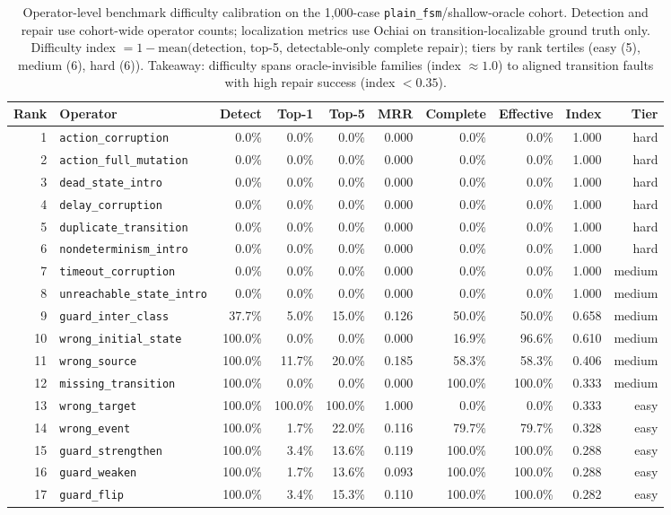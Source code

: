 \begin{table}[t]
\caption{Operator-level benchmark difficulty calibration on the 1{,}000-case \texttt{plain\_fsm}/shallow-oracle cohort. Detection and repair use cohort-wide operator counts; localization metrics use Ochiai on transition-localizable ground truth only. Difficulty index $=1-\mathrm{mean}($detection, top-5, detectable-only complete repair$)$; tiers by rank tertiles (easy (5), medium (6), hard (6)). Takeaway: difficulty spans oracle-invisible families (index $\approx 1.0$) to aligned transition faults with high repair success (index $<0.35$).}
\label{tab:operator-difficulty-ranking}
\small
\begin{tabular}{@{}rlrrrrrrrr@{}}
\toprule
Rank & Operator & Detect & Top-1 & Top-5 & MRR & Complete & Effective & Index & Tier \\
\midrule
1 & \texttt{action\_corruption} & 0.0\% & 0.0\% & 0.0\% & 0.000 & 0.0\% & 0.0\% & 1.000 & hard \\
2 & \texttt{action\_full\_mutation} & 0.0\% & 0.0\% & 0.0\% & 0.000 & 0.0\% & 0.0\% & 1.000 & hard \\
3 & \texttt{dead\_state\_intro} & 0.0\% & 0.0\% & 0.0\% & 0.000 & 0.0\% & 0.0\% & 1.000 & hard \\
4 & \texttt{delay\_corruption} & 0.0\% & 0.0\% & 0.0\% & 0.000 & 0.0\% & 0.0\% & 1.000 & hard \\
5 & \texttt{duplicate\_transition} & 0.0\% & 0.0\% & 0.0\% & 0.000 & 0.0\% & 0.0\% & 1.000 & hard \\
6 & \texttt{nondeterminism\_intro} & 0.0\% & 0.0\% & 0.0\% & 0.000 & 0.0\% & 0.0\% & 1.000 & hard \\
7 & \texttt{timeout\_corruption} & 0.0\% & 0.0\% & 0.0\% & 0.000 & 0.0\% & 0.0\% & 1.000 & medium \\
8 & \texttt{unreachable\_state\_intro} & 0.0\% & 0.0\% & 0.0\% & 0.000 & 0.0\% & 0.0\% & 1.000 & medium \\
9 & \texttt{guard\_inter\_class} & 37.7\% & 5.0\% & 15.0\% & 0.126 & 50.0\% & 50.0\% & 0.658 & medium \\
10 & \texttt{wrong\_initial\_state} & 100.0\% & 0.0\% & 0.0\% & 0.000 & 16.9\% & 96.6\% & 0.610 & medium \\
11 & \texttt{wrong\_source} & 100.0\% & 11.7\% & 20.0\% & 0.185 & 58.3\% & 58.3\% & 0.406 & medium \\
12 & \texttt{missing\_transition} & 100.0\% & 0.0\% & 0.0\% & 0.000 & 100.0\% & 100.0\% & 0.333 & medium \\
13 & \texttt{wrong\_target} & 100.0\% & 100.0\% & 100.0\% & 1.000 & 0.0\% & 0.0\% & 0.333 & easy \\
14 & \texttt{wrong\_event} & 100.0\% & 1.7\% & 22.0\% & 0.116 & 79.7\% & 79.7\% & 0.328 & easy \\
15 & \texttt{guard\_strengthen} & 100.0\% & 3.4\% & 13.6\% & 0.119 & 100.0\% & 100.0\% & 0.288 & easy \\
16 & \texttt{guard\_weaken} & 100.0\% & 1.7\% & 13.6\% & 0.093 & 100.0\% & 100.0\% & 0.288 & easy \\
17 & \texttt{guard\_flip} & 100.0\% & 3.4\% & 15.3\% & 0.110 & 100.0\% & 100.0\% & 0.282 & easy \\
\bottomrule
\end{tabular}
\end{table}
